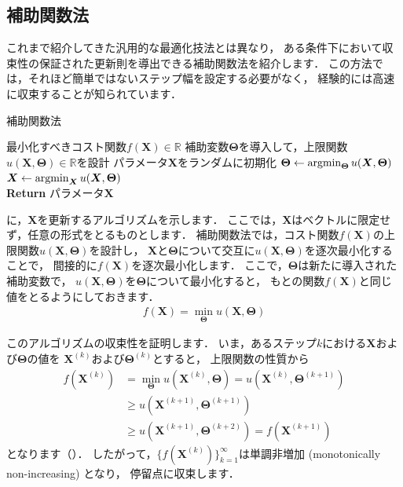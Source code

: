\subsection{補助関数法}
\label{sec:auxiliary_function}

これまで紹介してきた汎用的な最適化技法とは異なり，
ある条件下において収束性の保証された更新則を導出できる補助関数法を紹介します．
この方法では，それほど簡単ではないステップ幅を設定する必要がなく，
経験的には高速に収束することが知られています．

\begin{algobox}{補助関数法}
\label{algo:aux_function}
\begin{algorithmic}[1]
\Require 最小化すべきコスト関数$f(\bm{X}) \in \mathbb{R}$
\State 補助変数$\bm\Theta$を導入して，上限関数$u(\bm{X}, \bm\Theta) \in \mathbb{R}$を設計
\State パラメータ$\bm{X}$をランダムに初期化
\State $\bm\Theta \gets \mathop{\mathrm{argmin}}_{\bm\Theta} u(\bm{X}, \bm\Theta)$
\State $\bm{X} \gets \mathop{\mathrm{argmin}}_{\bm{X}} u(\bm{X}, \bm\Theta)$
\EndWhile\\
{\bf Return} パラメータ$\bm{X}$
\end{algorithmic}
\end{algobox}

に，$\bm{X}$を更新するアルゴリズムを示します．
ここでは，$\bm{X}$はベクトルに限定せず，任意の形式をとるものとします．
補助関数法では，コスト関数$f(\bm{X})$の上限関数$u(\bm{X}, \bm\Theta)$を設計し，
$\bm{X}$と$\bm\Theta$について交互に$u(\bm{X}, \bm\Theta)$を逐次最小化することで，
間接的に$f(\bm{X})$を逐次最小化します．
ここで，$\bm\Theta$は新たに導入された補助変数で，
$u(\bm{X}, \bm\Theta)$を$\bm\Theta$について最小化すると，
もとの関数$f(\bm{X})$と同じ値をとるようにしておきます．
\begin{align}
f(\bm{X}) = \min_{\bm\Theta} u(\bm{X},\bm\Theta)
\end{align}

このアルゴリズムの収束性を証明します．
いま，あるステップ$k$における$\bm{X}$および$\bm\Theta$の値を
$\bm{X}^{(k)}$および$\bm\Theta^{(k)}$とすると，
上限関数の性質から
\begin{align}
f(\bm{X}^{(k)}) 
&= \min_{\bm\Theta} u(\bm{X}^{(k)},\bm\Theta) = u(\bm{X}^{(k)},\bm\Theta^{(k + 1)})
\nonumber\\
&\ge u(\bm{X}^{(k + 1)},\bm\Theta^{(k + 1)})
\nonumber\\
&\ge u(\bm{X}^{(k + 1)},\bm\Theta^{(k + 2)})
= f(\bm{X}^{(k + 1)})
\end{align}
となります（）．
したがって，$\{f(\bm{X}^{(k)})\}_{k=1}^\infty$は単調非増加 (monotonically non-increasing) となり，
停留点に収束します．

